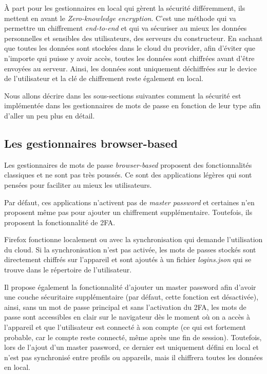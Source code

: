 À part pour les gestionnaires en local qui gèrent la sécurité différemment, ils mettent en avant le \textit{Zero-knowledge encryption}. C'est une méthode qui va permettre un chiffrement \textit{end-to-end} et qui va sécuriser au mieux les données personnelles et sensibles des utilisateurs, des serveurs du constructeur. En sachant que toutes les données sont stockées dans le cloud du provider, afin d'éviter que n'importe qui puisse y avoir accès, toutes les données sont chiffrées avant d'être envoyées au serveur. Ainsi, les données sont uniquement déchiffrées sur le device de l'utilisateur et la clé de chiffrement reste également en local.

Nous allons décrire dans les sous-sections suivantes comment la sécurité est implémentée dans les gestionnaires de mots de passe en fonction de leur type afin d'aller un peu plus en détail. 

\subsection{Les gestionnaires browser-based}
Les gestionnaires de mots de passe \textit{browser-based} proposent des fonctionnalités classiques et ne sont pas très poussés. Ce sont des applications légères qui sont pensées pour faciliter au mieux les utilisateurs.\cite{Browser}

Par défaut, ces applications n'activent pas de \textit{master password} et certaines n'en proposent même pas pour ajouter un chiffrement supplémentaire. Toutefois, ils proposent la fonctionnalité de 2FA.

Firefox fonctionne localement ou avec la synchronisation qui demande l'utilisation du cloud. Si la synchronisation n'est pas activée, les mots de passes stockés sont directement chiffrés sur l'appareil et sont ajoutés à un fichier \textit{logins.json} qui se trouve dans le répertoire de l'utilisateur. 

Il propose également la fonctionnalité d'ajouter un master password afin d'avoir une couche sécuritaire supplémentaire (par défaut, cette fonction est désactivée), ainsi, sans un mot de passe principal et sans l'activation du 2FA, les mots de passe sont accessibles en clair sur le navigateur dès le moment où on a accès à l'appareil et que l'utilisateur est connecté à son compte (ce qui est fortement probable, car le compte reste connecté, même après une fin de session). Toutefois, lors de l'ajout d'un master password, ce dernier est uniquement défini en local et n'est pas synchronisé entre profils ou appareils, mais il chiffrera toutes les données en local. 

